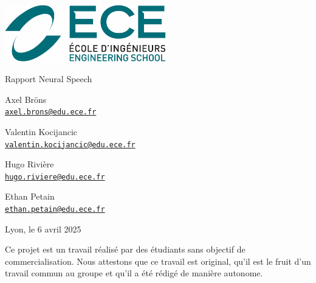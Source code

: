 \documentclass[a4paper,11pt]{article}
\begin{document}
\begin{titlepage}
    \noindent
    \begin{center}
        \centering
        \includegraphics[width=7cm]{images/ece.png} %
    \end{center}
	\vfill
	
	\vspace{1cm}
	\makebox[\linewidth]{\rule{\textwidth}{0.4pt}} %
    
    \centering
    {\Huge Rapport Neural Speech\par}
    
    \makebox[\linewidth]{\rule{\textwidth}{0.4pt}} %
    \vspace{1cm}	
	
    \begin{minipage}[t]{0.45\textwidth}
        \centering
        {\Large Axel Bröns \\ \texttt{\href{mailto:axel.brons@edu.ece.fr}{axel.brons@edu.ece.fr}}}
    \end{minipage}
    \hfill
    \begin{minipage}[t]{0.45\textwidth}
    	\centering
        {\Large Valentin Kocijancic \\ \texttt{\href{mailto:valentin.kocijancic@edu.ece.fr}{valentin.kocijancic@edu.ece.fr}}}
    \end{minipage}   
    \vfill
    \begin{minipage}[t]{0.45\textwidth}
        \centering
        {\Large Hugo Rivière \\ \texttt{\href{mailto:hugo.riviere@edu.ece.fr}{hugo.riviere@edu.ece.fr}}}
    \end{minipage}
    \hfill
    \begin{minipage}[t]{0.45\textwidth}
    	\centering
        {\Large Ethan Petain \\ \texttt{\href{mailto:ethan.petain@edu.ece.fr}{ethan.petain@edu.ece.fr}}}
    \end{minipage}  
    
    
    
    \vfill
    {\large Lyon, le 6 avril 2025\par}
    \vspace{1cm}
    {\normalsize Ce projet est un travail réalisé par des étudiants sans objectif de commercialisation. Nous attestons que ce travail est original, qu’il est le fruit d’un travail commun au groupe et qu’il a été rédigé de manière autonome.\par}
\end{titlepage}
\end{document}
